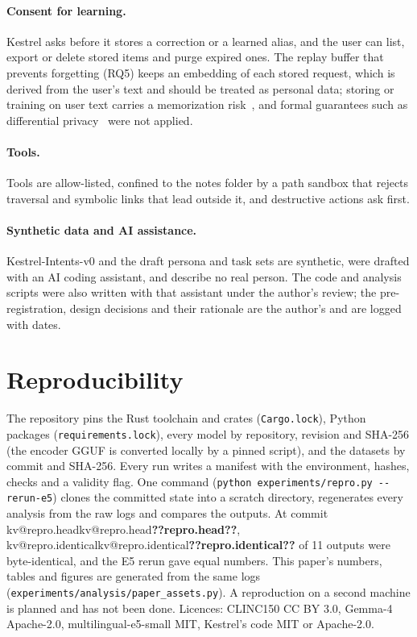 \documentclass[11pt,a4paper]{article}
\makeatletter
\DeclareRobustCommand{\kv}[1]{\ifcsname kv@#1\endcsname\csname kv@#1\endcsname\else\textbf{??#1??}\fi}
\makeatother
\begin{document}
\paragraph{Consent for learning.} Kestrel asks before it stores a correction or a learned alias, and the user can list,
export or delete stored items and purge expired ones. The replay buffer that prevents forgetting (RQ5) keeps an embedding
of each stored request, which is derived from the user's text and should be treated as personal data; storing or
training on user text carries a memorization risk~\citep{carlini2021extracting}, and formal guarantees such as
differential privacy~\citep{abadi2016dpsgd} were not applied.

\paragraph{Tools.} Tools are allow-listed, confined to the notes folder by a path sandbox that rejects traversal and
symbolic links that lead outside it, and destructive actions ask first.

\paragraph{Synthetic data and AI assistance.} Kestrel-Intents-v0 and the draft persona and task sets are synthetic,
were drafted with an AI coding assistant, and describe no real person. The code and analysis scripts were also written
with that assistant under the author's review; the pre-registration, design decisions and their rationale are the
author's and are logged with dates.

\section{Reproducibility}\label{sec:repro}

\begin{sloppypar}
The repository pins the Rust toolchain and crates (\texttt{Cargo.lock}), Python packages (\texttt{requirements.lock}),
every model by repository, revision and SHA-256 (the encoder GGUF is converted locally by a pinned script), and the
datasets by commit and SHA-256. Every run writes a manifest with the environment, hashes, checks and a validity flag.
One command (\texttt{python experiments/repro.py -{}-rerun-e5}) clones the committed state into a scratch directory,
regenerates every analysis from the raw logs and compares the outputs. At commit \kv{repro.head},
\kv{repro.identical} of 11 outputs were byte-identical, and the E5 rerun gave equal numbers. This paper's numbers,
tables and figures are generated from the same logs (\texttt{experiments/analysis/paper\_assets.py}). A reproduction
on a second machine is planned and has not been done. Licences: CLINC150 CC BY 3.0, Gemma-4 Apache-2.0,
multilingual-e5-small MIT, Kestrel's code MIT or Apache-2.0.
\end{sloppypar}
\end{document}
